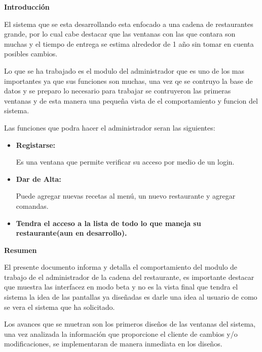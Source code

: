 \documentclass[10pt,a4paper]{report}
\begin{document}
\begin{titlepage}
{\Large\bfseries Introducción\par}
 \vspace{.5cm}
 \justify
	El sistema que se esta desarrollando esta enfocado a una cadena de restaurantes grande, por lo cual cabe destacar que las ventanas con las que contara son muchas y el tiempo de entrega se estima alrededor de 1 año sin tomar en cuenta posibles cambios.\par 
	\justify
	Lo que se ha trabajado es el modulo del administrador que es uno de los mas importantes ya que sus funciones son muchas, una vez qe se contruyo la base de datos y se preparo lo necesario para trabajar se contruyeron las primeras ventanas y de esta manera una pequeña vista de el comportamiento y funcion del sistema.\par 
	\justify
	Las funciones que podra hacer el administrador seran las siguientes:\par 
	\vspace{.5cm}
	\begin{itemize}
\item{\textbf{Registarse:}\par Es una ventana que permite verificar su acceso por medio de un login.}
\item{\textbf{Dar de Alta:}\par Puede agregar nuevas recetas al menú, un nuevo restaurante y agregar comandas.}
\item{\textbf{Tendra el acceso a la lista de todo lo que maneja su restaurante(aun en desarrollo).}\par}
\end{itemize}
 \vspace{1cm}
\end{titlepage}


\begin{titlepage}
\begin{flushleft}
{\Large\bfseries Resumen\par}
 \vspace{.5cm}
 \justify
 	El presente documento informa y detalla el comportamiento del modulo de trabajo de el administrador de la cadena del restaurante, es importante destacar que muestra las interfacez en modo beta y no es la vista final que tendra el sistema la idea de las pantallas ya diseñadas es darle una idea al usuario de como se vera el sistema que ha solicitado.\par
 	\justify
 	Los avances que se muetran son los primeros diseños de las ventanas del sistema, una vez analizada la información que proporcione el cliente de cambios y/o modificaciones, se implementaran de manera inmediata en los diseños.
\vspace{1cm}
\end{flushleft}
\end{titlepage}
\end{document}
